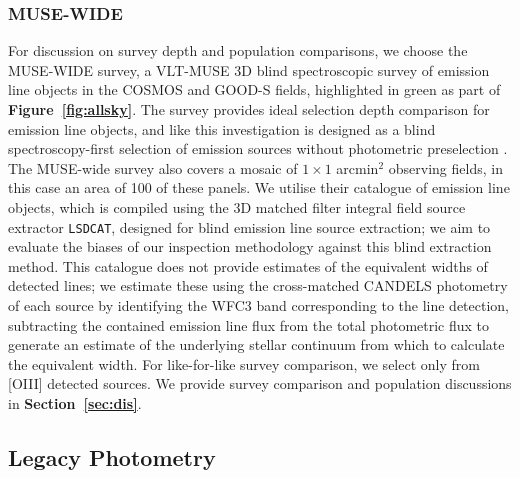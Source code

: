 \documentclass[fleqn,usenatbib]{mnras}
\begin{document}
\subsubsection{MUSE-WIDE}
For discussion on survey depth and population comparisons, we choose the \cite{musewide_description} MUSE-WIDE survey, a VLT-MUSE 3D blind spectroscopic survey of emission line objects in the COSMOS \citep{cosmos} and GOOD-S \citep{goods} fields, highlighted in green as part of \textbf{Figure~\ref{fig:allsky}}. The survey provides ideal selection depth comparison for emission line objects, and like this investigation is designed as a blind spectroscopy-first selection of emission sources without photometric preselection \citep{herenz2017}. The MUSE-wide survey also covers a mosaic of $1\times1$ arcmin$^2$ observing fields, in this case an area of 100 of these panels. We utilise their catalogue of emission line objects, which is compiled using the \cite{lsdcat} 3D matched filter integral field source extractor \texttt{LSDCAT}, designed for blind emission line source extraction; we aim to evaluate the biases of our inspection methodology against this blind extraction method. This catalogue does not provide estimates of the equivalent widths of detected lines; we estimate these using the \cite{skelton2017} cross-matched CANDELS photometry of each source by identifying the WFC3 band corresponding to the line detection, subtracting the contained emission line flux from the total photometric flux to generate an estimate of the underlying stellar continuum from which to calculate the equivalent width. For like-for-like survey comparison, we select only from [OIII] detected sources. We provide survey comparison and population discussions in \textbf{Section~\ref{sec:dis}}.

\subsection{Legacy Photometry}
\label{sec:phot}
\end{document}
